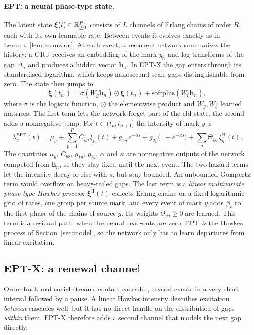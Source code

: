 \paragraph{EPT: a neural phase-type state.} The latent state $\bm\xi(t)\in\mathbb{R}_{\ge0}^P$ consists of
$L$ channels of Erlang chains of order $R$, each with its own learnable rate. Between events it
evolves exactly as in Lemma~\ref{lem:recursion}. At each event, a recurrent network summarises the
history: a GRU \citep{cho2014learning} receives an embedding of the mark $y_n$ and log transforms of
the gap $\Delta_n$ and produces a hidden vector $\bm h_n$. In EPT-X the gap enters through its
standardised logarithm, which keeps nanosecond-scale gaps distinguishable from zero. The state
then jumps to
\[
\bm\xi(t_n^+)=\sigma(W_g\bm h_n)\odot\bm\xi(t_n^-)+\mathrm{softplus}(W_\xi\bm h_n),
\]
where $\sigma$ is the logistic function, $\odot$ the elementwise product and $W_g,W_\xi$ learned
matrices. The first term lets the network forget part of the old state; the second adds a
nonnegative jump. For $t\in(t_n,t_{n+1}]$ the intensity of mark $y$ is
\begin{equation}\label{eq:ept}
\lambda^{\mathrm{EPT}}_y(t)=\mu_y+\sum_{p=1}^{P}C_{yp}\,\xi_p(t)
+g_{1y}\,e^{-\alpha s}+g_{2y}\bigl(1-e^{-\kappa s}\bigr)
+\sum_{q}\Theta_{yq}\,\xi^{\mathrm{H}}_q(t).
\end{equation}
The quantities $\mu_y$, $C_{yp}$, $g_{1y}$, $g_{2y}$, $\alpha$ and $\kappa$ are nonnegative outputs
of the network computed from $\bm h_n$, so they stay fixed until the next event. The two hazard
terms let the intensity decay or rise with $s$, but stay bounded. An unbounded Gompertz term would
overflow on heavy-tailed gaps. The last term is a \emph{linear multivariate phase-type Hawkes
process}: $\bm\xi^{\mathrm{H}}(t)$ collects Erlang chains on a fixed logarithmic grid of rates, one
group per source mark, and every event of mark $y$ adds $\beta_k$ to the first phase of the chains
of source $y$. Its weights $\Theta_{yq}\ge0$ are learned. This term is a residual path: when the
neural read-outs are zero, EPT \emph{is} the Hawkes process of Section~\ref{sec:model}, so the network
only has to learn departures from linear excitation.

\subsection{EPT-X: a renewal channel}\label{sec:eptx}
 Order-book and social streams contain cascades, several events in
a very short interval followed by a pause. A linear Hawkes intensity describes excitation
\emph{between} cascades well, but it has no direct handle on the distribution of gaps
\emph{within} them. EPT-X therefore adds a second channel that models the next gap directly.

